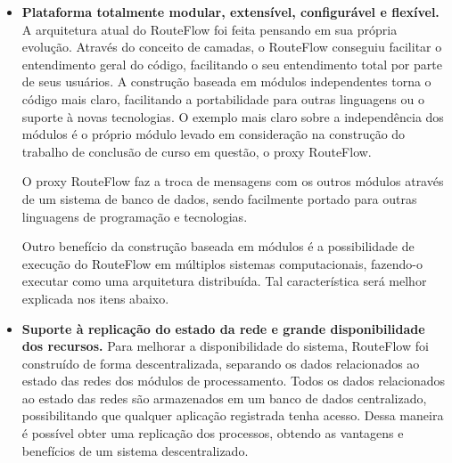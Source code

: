 \begin{itemize}
\item \textbf{Plataforma totalmente modular, extensível, 
configurável e flexível.} A arquitetura atual do RouteFlow 
foi feita pensando em sua própria evolução. Através do 
conceito de camadas, o RouteFlow conseguiu facilitar o entendimento
geral do código, facilitando o seu entendimento total por parte de 
seus usuários. A construção baseada em módulos independentes
torna o código mais claro, facilitando a portabilidade para outras 
linguagens ou o suporte à novas tecnologias. O exemplo mais 
claro sobre a independência dos módulos é o próprio módulo levado em consideração
na construção do trabalho de conclusão de curso em questão, o
proxy RouteFlow. 

O proxy RouteFlow faz a troca de mensagens com os outros módulos 
através de um sistema de banco de dados, sendo facilmente
portado para outras linguagens de programação e tecnologias.

Outro benefício da construção baseada em módulos é a possibilidade
de execução do RouteFlow em múltiplos sistemas computacionais, 
fazendo-o executar como uma arquitetura distribuída. Tal 
característica será melhor explicada nos itens abaixo.
\item \textbf{Suporte à replicação do estado da rede e grande
disponibilidade dos recursos.} Para melhorar a disponibilidade
do sistema, RouteFlow foi construído de forma descentralizada, 
separando os dados relacionados ao estado das redes dos módulos de processamento.
Todos os dados relacionados ao estado das redes são armazenados
em um banco de dados centralizado, possibilitando que qualquer aplicação 
registrada tenha acesso. Dessa maneira é possível obter uma 
replicação dos processos, obtendo as vantagens e benefícios
de um sistema descentralizado. 


\end{itemize}
